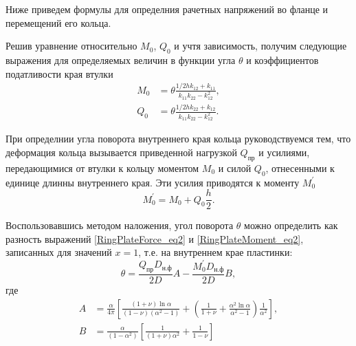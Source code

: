 Ниже приведем формулы для определния рачетных напряжений во фланце и перемещений его кольца.

Решив уравнение относительно $M_0$, $Q_0$ и учтя зависимость, получим следующие выражения для определяемых величин в функции угла $\theta$ и коэффициентов податливости края втулки
\begin{equation}
  \label{SolidFlange_eq1}
  \begin{split}
    M_0&=\theta \frac{1/2 h k_{12} +k_{11}}{k_{11}k_{22}-k_{12}^2},\\
    Q_0&=\theta \frac{1/2 h k_{22} +k_{12}}{k_{11}k_{22}-k_{12}^2}.
  \end{split}
\end{equation}

При определнии угла поворота внутреннего края кольца руководствуемся тем, что деформация кольца вызывается приведенной нагрузкой $Q_{\text{пр}}$ и усилиями, передающимися от втулки к кольцу моментом $M_0$ и силой $Q_0$, отнесенными к единице длинны внутреннего края. Эти усилия приводятся к моменту $M_0^{\prime}$
\begin{equation}
  \label{SolidFlange_eq2}
    M_0^{\prime}=M_0 +Q_0 \frac{h}{2}.
\end{equation}

Воспользовавшись методом наложения, угол поворота $\theta$ можно определить как разность выражений \eqref{RingPlateForce_eq2} и \eqref{RingPlateMoment_eq2}, записанных для значений $x=1$, т.е. на внутреннем крае пластинки:
\begin{equation}
  \label{SolidFlange_eq3}
    \theta =\frac{Q_{\text{пр}} D_{\text{н.ф}}}{2D}A - \frac{M_0^{\prime} D_{\text{н.ф}}}{2D}B,
\end{equation}
где 
\begin{equation}
  \label{SolidFlange_eq4}
  \begin{split}
    A&=\frac{\alpha}{4 \pi} \left[ \frac{\left( 1+\nu \right)\ln{\alpha}}{\left(1-\nu \right) \left({\alpha}^2 -1\right)} +\left( \frac{1}{1+\nu}+\frac{{\alpha}^2 \ln{\alpha}}{{\alpha}^2 -1} \right)\frac{1}{{\alpha}^2} \right],\\
    B&=\frac{\alpha}{\left(1-{\alpha}^2 \right)} \left[ \frac{1}{\left(1+\nu \right) {\alpha}^2}+\frac{1}{1-\nu} \right]
  \end{split}
\end{equation}

